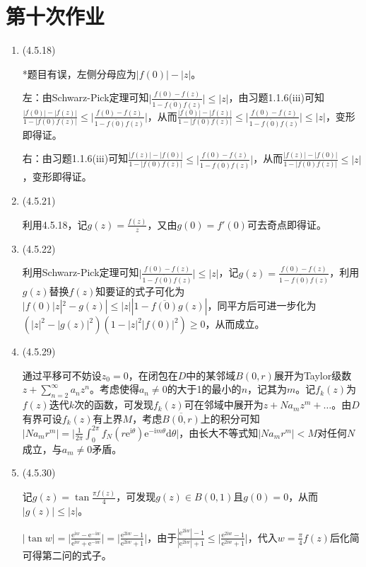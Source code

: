 \documentclass[a4paper,UTF8,fontset=windows]{ctexart}
\begin{document}
\section{第十次作业}
\begin{enumerate}
    \item (4.5.18)
    
    *题目有误，左侧分母应为$|f(0)|-|z|$。
    
    左：由Schwarz-Pick定理可知$\big|\frac{f(0)-f(z)}{1-\overline{f(0)}f(z)}\big|\le|z|$，由习题1.1.6(iii)可知$\frac{|f(0)|-|f(z)|}{1-|f(0)f(z)|}\le\big|\frac{f(0)-f(z)}{1-\overline{f(0)}f(z)}\big|$，从而$\frac{|f(0)|-|f(z)|}{1-|f(0)f(z)|}\le\big|\frac{f(0)-f(z)}{1-\overline{f(0)}f(z)}\big|\le|z|$，变形即得证。
    
    右：由习题1.1.6(iii)可知$\frac{|f(z)|-|f(0)|}{1-|f(0)f(z)|}\le\big|\frac{f(0)-f(z)}{1-\overline{f(0)}f(z)}\big|$，从而$\frac{|f(z)|-|f(0)|}{1-|f(0)f(z)|}\le|z|$，变形即得证。
    
    \item (4.5.21)
    
    利用4.5.18，记$g(z)=\frac{f(z)}{z}$，又由$g(0)=f'(0)$可去奇点即得证。
    
    \item (4.5.22)
    
    利用Schwarz-Pick定理可知$\big|\frac{f(0)-f(z)}{1-\overline{f(0)}f(z)}\big|\le|z|$，记$g(z)=\frac{f(0)-f(z)}{1-\overline{f(0)}f(z)}$，利用$g(z)$替换$f(z)$知要证的式子可化为$|f(0)|z|^2-g(z)|\le|z||1-\overline{f(0)}g(z)|$，同平方后可进一步化为$(|z|^2-|g(z)|^2)(1-|z|^2|f(0)|^2)\ge0$，从而成立。
    
    \item (4.5.29)
    
    通过平移可不妨设$z_0=0$，在闭包在$D$中的某邻域$B(0,r)$展开为Taylor级数$z+\sum_{n=2}^\infty a_nz^n$。考虑使得$a_n\ne0$的大于1的最小的$n$，记其为$m$。记$f_k(z)$为$f(z)$迭代$k$次的函数，可发现$f_k(z)$可在邻域中展开为$z+Na_mz^m+\dots$。由$D$有界可设$f_k(z)$有上界$M$，考虑$\overline{B(0,r)}$上的积分可知$|Na_mr^m|=\big|\frac{1}{2\pi}\int_0^{2\pi}f_N(r\mathrm{e}^{\mathrm{i}\theta})\mathrm{e}^{-\mathrm{i}m\theta}\mathrm{d}\theta\big|$，由长大不等式知$|Na_mr^m|<M$对任何$N$成立，与$a_m\ne0$矛盾。
    
    \item (4.5.30)
    
    记$g(z)=\tan\frac{\pi f(z)}{4}$，可发现$g(z)\in B(0,1)$且$g(0)=0$，从而$|g(z)|\le|z|$。
    
    $|\tan w|=\big|\frac{\mathrm{e}^{\mathrm{i}w}-\mathrm{e}^{\mathrm{-i}w}}{\mathrm{e}^{\mathrm{i}w}+\mathrm{e}^{-\mathrm{i}w}}\big|=\big|\frac{\mathrm{e}^{2\mathrm{i}w}-1}{\mathrm{e}^{2\mathrm{i}w}+1}\big|$，由于$\frac{|\mathrm{e}^{2\mathrm{i}w}|-1}{|\mathrm{e}^{2\mathrm{i}w}|+1}\le\big|\frac{\mathrm{e}^{2\mathrm{i}w}-1}{\mathrm{e}^{2\mathrm{i}w}+1}\big|$，代入$w=\frac{\pi}{4}f(z)$后化简可得第二问的式子。
    

\end{enumerate}
\end{document}
